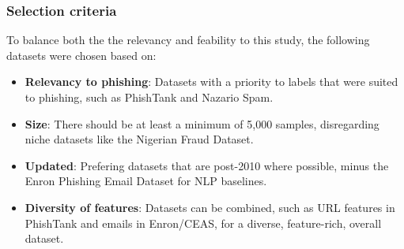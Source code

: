
\subsubsection*{Selection criteria} 
To balance both the the relevancy and feability to this study, the following datasets were chosen based on:

\begin{itemize}
  \item \textbf{Relevancy to phishing}: Datasets with a priority to labels that were suited to phishing, such as PhishTank and Nazario Spam.
  \item \textbf{Size}: There should be at least a minimum of 5,000 samples, disregarding niche datasets like the Nigerian Fraud Dataset.
  \item \textbf{Updated}: Prefering datasets that are post-2010 where possible, minus the Enron Phishing Email Dataset for NLP baselines.
  \item \textbf{Diversity of features}: Datasets can be combined, such as URL features in PhishTank and emails in Enron/CEAS, for a diverse, feature-rich, overall dataset.
\end{itemize}
